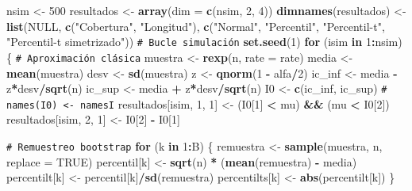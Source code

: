 \documentclass[
]{book}
\newenvironment{Shaded}{\begin{snugshade}}{\end{snugshade}}
\newcommand{\AttributeTok}[1]{\textcolor[rgb]{0.13,0.29,0.53}{#1}}
\newcommand{\CommentTok}[1]{\textcolor[rgb]{0.56,0.35,0.01}{\textit{#1}}}
\newcommand{\ConstantTok}[1]{\textcolor[rgb]{0.56,0.35,0.01}{#1}}
\newcommand{\ControlFlowTok}[1]{\textcolor[rgb]{0.13,0.29,0.53}{\textbf{#1}}}
\newcommand{\DecValTok}[1]{\textcolor[rgb]{0.00,0.00,0.81}{#1}}
\newcommand{\FunctionTok}[1]{\textcolor[rgb]{0.13,0.29,0.53}{\textbf{#1}}}
\newcommand{\NormalTok}[1]{#1}
\newcommand{\OtherTok}[1]{\textcolor[rgb]{0.56,0.35,0.01}{#1}}
\newcommand{\SpecialCharTok}[1]{\textcolor[rgb]{0.81,0.36,0.00}{\textbf{#1}}}
\newcommand{\StringTok}[1]{\textcolor[rgb]{0.31,0.60,0.02}{#1}}
\theoremstyle{break}
\theoremstyle{nonumberplain}
\renewcommand{\CommentTok}[1]{\textcolor[rgb]{0.41,0.41,0.41}{\texttt{#1}}}
\begin{document}
\begin{Shaded}
\begin{Highlighting}[]
\NormalTok{nsim }\OtherTok{\textless{}{-}} \DecValTok{500}
\NormalTok{resultados }\OtherTok{\textless{}{-}} \FunctionTok{array}\NormalTok{(}\AttributeTok{dim =} \FunctionTok{c}\NormalTok{(nsim, }\DecValTok{2}\NormalTok{, }\DecValTok{4}\NormalTok{))}
\FunctionTok{dimnames}\NormalTok{(resultados) }\OtherTok{\textless{}{-}} \FunctionTok{list}\NormalTok{(}\ConstantTok{NULL}\NormalTok{, }\FunctionTok{c}\NormalTok{(}\StringTok{"Cobertura"}\NormalTok{, }\StringTok{"Longitud"}\NormalTok{),}
        \FunctionTok{c}\NormalTok{(}\StringTok{"Normal"}\NormalTok{, }\StringTok{"Percentil"}\NormalTok{, }\StringTok{"Percentil{-}t"}\NormalTok{, }\StringTok{"Percentil{-}t simetrizado"}\NormalTok{))}
\CommentTok{\# Bucle simulación}
\FunctionTok{set.seed}\NormalTok{(}\DecValTok{1}\NormalTok{)}
\ControlFlowTok{for}\NormalTok{ (isim }\ControlFlowTok{in} \DecValTok{1}\SpecialCharTok{:}\NormalTok{nsim) \{}
    \CommentTok{\# Aproximación clásica}
\NormalTok{    muestra }\OtherTok{\textless{}{-}} \FunctionTok{rexp}\NormalTok{(n, }\AttributeTok{rate =}\NormalTok{ rate)}
\NormalTok{    media }\OtherTok{\textless{}{-}} \FunctionTok{mean}\NormalTok{(muestra)}
\NormalTok{    desv }\OtherTok{\textless{}{-}} \FunctionTok{sd}\NormalTok{(muestra)}
\NormalTok{    z }\OtherTok{\textless{}{-}} \FunctionTok{qnorm}\NormalTok{(}\DecValTok{1} \SpecialCharTok{{-}}\NormalTok{ alfa}\SpecialCharTok{/}\DecValTok{2}\NormalTok{)}
\NormalTok{    ic\_inf }\OtherTok{\textless{}{-}}\NormalTok{ media }\SpecialCharTok{{-}}\NormalTok{ z}\SpecialCharTok{*}\NormalTok{desv}\SpecialCharTok{/}\FunctionTok{sqrt}\NormalTok{(n)}
\NormalTok{    ic\_sup }\OtherTok{\textless{}{-}}\NormalTok{ media }\SpecialCharTok{+}\NormalTok{ z}\SpecialCharTok{*}\NormalTok{desv}\SpecialCharTok{/}\FunctionTok{sqrt}\NormalTok{(n)}
\NormalTok{    I0 }\OtherTok{\textless{}{-}} \FunctionTok{c}\NormalTok{(ic\_inf, ic\_sup)}
    \CommentTok{\# names(I0) \textless{}{-} namesI}
\NormalTok{    resultados[isim, }\DecValTok{1}\NormalTok{, }\DecValTok{1}\NormalTok{] }\OtherTok{\textless{}{-}}\NormalTok{ (I0[}\DecValTok{1}\NormalTok{] }\SpecialCharTok{\textless{}}\NormalTok{ mu) }\SpecialCharTok{\&\&}\NormalTok{ (mu }\SpecialCharTok{\textless{}}\NormalTok{ I0[}\DecValTok{2}\NormalTok{])}
\NormalTok{    resultados[isim, }\DecValTok{2}\NormalTok{, }\DecValTok{1}\NormalTok{] }\OtherTok{\textless{}{-}}\NormalTok{ I0[}\DecValTok{2}\NormalTok{] }\SpecialCharTok{{-}}\NormalTok{ I0[}\DecValTok{1}\NormalTok{]}
    
    \CommentTok{\# Remuestreo bootstrap}
    \ControlFlowTok{for}\NormalTok{ (k }\ControlFlowTok{in} \DecValTok{1}\SpecialCharTok{:}\NormalTok{B) \{}
\NormalTok{        remuestra }\OtherTok{\textless{}{-}} \FunctionTok{sample}\NormalTok{(muestra, n, }\AttributeTok{replace =} \ConstantTok{TRUE}\NormalTok{)}
\NormalTok{        percentil[k] }\OtherTok{\textless{}{-}} \FunctionTok{sqrt}\NormalTok{(n) }\SpecialCharTok{*}\NormalTok{ (}\FunctionTok{mean}\NormalTok{(remuestra) }\SpecialCharTok{{-}}\NormalTok{ media)}
\NormalTok{        percentilt[k] }\OtherTok{\textless{}{-}}\NormalTok{ percentil[k]}\SpecialCharTok{/}\FunctionTok{sd}\NormalTok{(remuestra)}
\NormalTok{        percentilts[k] }\OtherTok{\textless{}{-}} \FunctionTok{abs}\NormalTok{(percentilt[k])}
\NormalTok{    \}}
    

\end{Highlighting}
\end{Shaded}
\end{document}
